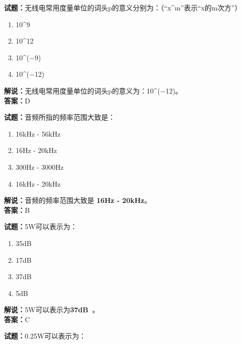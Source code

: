 \documentclass{ctexbook}
\begin{document}
\noindent\textbf{试题：}无线电常用度量单位的词头p的意义分别为：（“x\string^m”表示“x的m次方”）

\begin{enumerate}[leftmargin=3em]
	\item \num{10}\string^\num{9}
	\item \num{10}\string^\num{12}
	\item \num{10}\string^(\num{-9})
	\item \num{10}\string^(\num{-12})
\end{enumerate}

\noindent\textbf{解说：}无线电常用度量单位的词头p的意义为：\num{10}\string^(\num{-12})。\cite[143]{si}\\
\noindent\textbf{答案：}D


\bigskip


\noindent\textbf{试题：}音频所指的频率范围大致是：

\begin{enumerate}[leftmargin=3em]
	\item 16\si{\kHz} - 56\si{\kHz}
	\item 16\unit{\hertz} - 20\si{\kHz}
	\item 300\unit{\hertz} - 3000\unit{\hertz}
	\item 16\si{\kHz} - 20\si{\kHz}
\end{enumerate}

\noindent\textbf{解说：}音频的频率范围大致是 \textbf{16\unit{\hertz} - 20\si{\kHz}}。\\\noindent\textbf{答案：}B


\bigskip


\noindent\textbf{试题：}5W可以表示为：

\begin{enumerate}[leftmargin=3em]
	\item 35\unit[qualifier-mode=combine]{\deci\bel{}}
	\item 17\unit[qualifier-mode=combine]{\deci\bel{}}
	\item 37\unit[qualifier-mode=combine]{\deci\bel{}}
	\item 5\unit[qualifier-mode=combine]{\deci\bel{}}
\end{enumerate}

\noindent\textbf{解说：}5W可以表示为\textbf{37\unit[qualifier-mode=combine]{\deci\bel{}}}。\\\noindent\textbf{答案：}C


\bigskip


\noindent\textbf{试题：}0.25W可以表示为：
\end{document}
